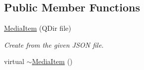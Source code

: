 \subsection*{Public Member Functions}
\begin{DoxyCompactItemize}
\item 
\hyperlink{class_a_w_e_1_1_media_item_a45c538cd1cfb0fca5aca1dfd8b88c1da}{Media\-Item} (Q\-Dir file)
\begin{DoxyCompactList}\small\item\em Create from the given J\-S\-O\-N file. \end{DoxyCompactList}\item 
\hypertarget{class_a_w_e_1_1_media_item_a6999ea20d13e6fcd55b2d4104ca15b78}{virtual \hyperlink{class_a_w_e_1_1_media_item_a6999ea20d13e6fcd55b2d4104ca15b78}{$\sim$\-Media\-Item} ()}\label{class_a_w_e_1_1_media_item_a6999ea20d13e6fcd55b2d4104ca15b78}


\end{DoxyCompactItemize}
